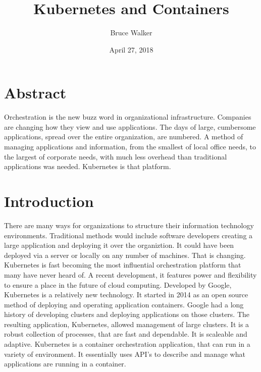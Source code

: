 
\title{Kubernetes and Containers}
\author{Bruce Walker}

 
\date{ April 27, 2018}

\maketitle 
\section{Abstract}

Orchestration is the new buzz word in organizational infrastructure.
Companies are changing how they view and use applications.  The days
of large, cumbersome applications, spread over the entire
organization, are numbered.  A method of
managing applications and information, from the smallest of local 
office needs, to the largest of corporate needs, with much less 
overhead than traditional applications was needed.  Kubernetes is that 
platform.  



\section{Introduction}

There are many ways for organizations to structure their information
technology environments.  Traditional methods would include software
developers creating a large application and deploying it over the
organiztion. It could have been deployed via a server or locally on
any number of machines.  That is changing.  Kubernetes is fast 
becoming the most influential orchestration platform that
many have never heard of.  A recent development, it features power and
flexibility to ensure a place in the future of cloud computing.
Developed by Google, Kubernetes is a relatively new technology.  It
started in 2014 as an open source method of deploying and operating
application containers.  Google had a long history of developing
clusters and deploying applications on those clusters.  The resulting
application, Kubernetes, allowed management of large clusters. It is
a robust collection of processes, that are fast and dependable.  It is
scaleable and adaptive. Kubernetes is a container orchestration
application, that can run in a variety of environment.  It essentially
uses API's to describe and manage what applications are running in a 
container.  \cite {hid-sp18-525-concept}



